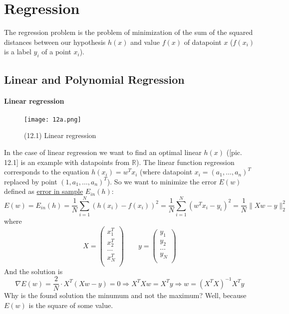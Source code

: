 \chapter{Regression}

{\sf The regression problem is the problem of minimization of the sum of the squared distances between our hypothesis $h(x)$ and value $f(x)$ of datapoint $x$ ($f(x_i)$ is a label $y_i$ of a point $x_i$).}

\section{Linear and Polynomial Regression}
\vspace{-0.6cm}
\subsubsection*{Linear regression}

\begin{wrapfigure}{r}{0.3\linewidth}
	\vspace{-3cm}
  \begin{center}
    \texttt{[image: 12a.png]}
  \end{center}
  \vspace{-0.8cm}
  \caption*{(12.1) Linear regression}
\end{wrapfigure}
In the case of linear regression we want to find  an optimal linear $h(x)$ ([pic. 12.1] is an example with datapoints from $\mathbb{R}$). The linear function regression corresponds to the equation $h(x_i)=w^Tx_i$ (where datapoint $x_i=(a_1,\ldots,a_n)^T$ replaced by point $(1, a_1,\ldots,a_n)^T$). So we want to minimize the error $E(w)$ defined as \hyperlink{ein_and_eout}{error in sample} $E_{in}(h)$:
$$E(w)=E_{in}(h)=\frac{1}{N}\sum\limits_{i=1}^{N}(h(x_i)-f(x_i))^2=\frac{1}{N}\sum\limits_{i=1}^{N}(w^Tx_i-y_i)^2=\frac{1}{N}\|Xw-y\|_2^2$$
where
$$X=\begin{pmatrix}
	x_1^T \\
	x_2^T \\
	\ldots \\
	x_N^T \\
	\end{pmatrix} \qquad
	y=\begin{pmatrix}
	y_1 \\
	y_2 \\
	\ldots \\
	y_N \\
	\end{pmatrix}$$
And the solution is
$$\nabla E(w)=\frac{2}{N}\cdot X^T(Xw-y)=0\Rightarrow X^TXw=X^Ty\Rightarrow w=(X^TX)^{-1}X^Ty$$
Why is the found solution the minumum and not the maximum? Well, because $E(w)$ is the square of some value.

